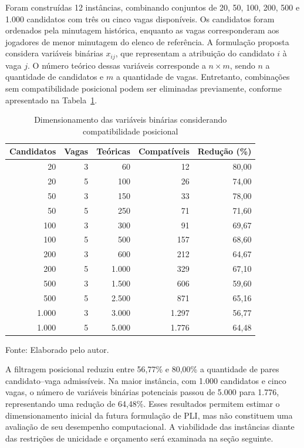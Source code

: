 \documentclass[12pt,a4paper]{article}
\begin{document}
Foram construídas 12 instâncias, combinando conjuntos de 20, 50, 100, 200, 500 e 1.000 candidatos com três ou cinco vagas disponíveis. Os candidatos foram ordenados pela minutagem histórica, enquanto as vagas corresponderam aos jogadores de menor minutagem do elenco de referência. A formulação proposta considera variáveis binárias $x_{ij}$, que representam a atribuição do candidato $i$ à vaga $j$. O número teórico dessas variáveis corresponde a $n \times m$, sendo $n$ a quantidade de candidatos e $m$ a quantidade de vagas. Entretanto, combinações sem compatibilidade posicional podem ser eliminadas previamente, conforme apresentado na Tabela~\ref{tab:dimensionamento_variaveis}.

\begin{table}[htbp]
    \centering
    \caption{Dimensionamento das variáveis binárias considerando compatibilidade posicional}
    \label{tab:dimensionamento_variaveis}
    \begin{tabular}{rrrrr}
        \hline
        \textbf{Candidatos} & \textbf{Vagas} & \textbf{Teóricas} & \textbf{Compatíveis} & \textbf{Redução (\%)} \\
        \hline
        20    & 3 & 60    & 12    & 80,00 \\
        20    & 5 & 100   & 26    & 74,00 \\
        50    & 3 & 150   & 33    & 78,00 \\
        50    & 5 & 250   & 71    & 71,60 \\
        100   & 3 & 300   & 91    & 69,67 \\
        100   & 5 & 500   & 157   & 68,60 \\
        200   & 3 & 600   & 212   & 64,67 \\
        200   & 5 & 1.000 & 329   & 67,10 \\
        500   & 3 & 1.500 & 606   & 59,60 \\
        500   & 5 & 2.500 & 871   & 65,16 \\
        1.000 & 3 & 3.000 & 1.297 & 56,77 \\
        1.000 & 5 & 5.000 & 1.776 & 64,48 \\
        \hline
    \end{tabular}
    \par\smallskip
    \footnotesize Fonte: Elaborado pelo autor.
\end{table}

A filtragem posicional reduziu entre 56,77\% e 80,00\% a quantidade de pares candidato--vaga admissíveis. Na maior instância, com 1.000 candidatos e cinco vagas, o número de variáveis binárias potenciais passou de 5.000 para 1.776, representando uma redução de 64,48\%. Esses resultados permitem estimar o dimensionamento inicial da futura formulação de PLI, mas não constituem uma avaliação de seu desempenho computacional. A viabilidade das instâncias diante das restrições de unicidade e orçamento será examinada na seção seguinte.
\end{document}

